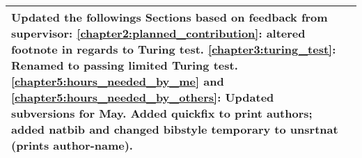 \begin{center}
\begin{tabular}[H]{|l|p{35em}|}
		Updated the followings Sections based on feedback from supervisor: \newline 
		\ref{chapter2:planned_contribution}: altered footnote in regards to Turing test. \newline
		\ref{chapter3:turing_test}: Renamed to passing limited Turing test. \newline
		\ref{chapter5:hours_needed_by_me} and \ref{chapter5:hours_needed_by_others}: Updated subversions for May. \newline
		Added quickfix to print authors; added natbib and changed bibstyle temporary to unsrtnat (prints author-name). \\
		\hline
	\end{tabular}
\end{center}

